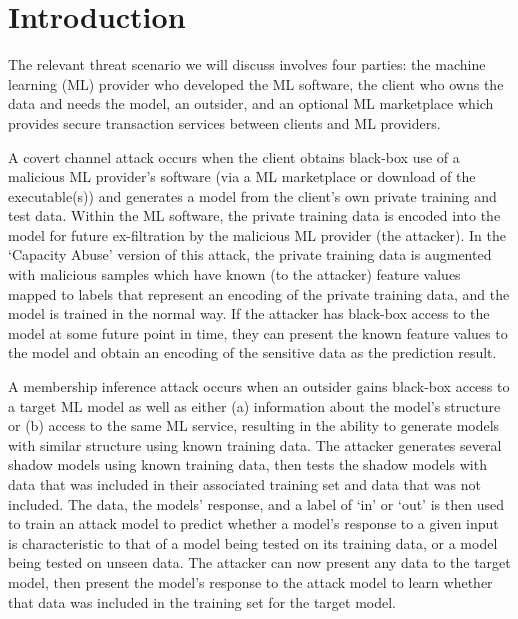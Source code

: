 \section{Introduction}
The relevant threat scenario we will discuss involves four parties: the machine learning (ML) provider who developed the ML software, the client who owns the data and needs the model, an outsider, and an optional ML marketplace which provides secure transaction services between clients and ML providers.

A covert channel attack occurs when the client obtains black-box use of a malicious ML provider's software (via a ML marketplace or download of the executable(s)) and generates a model from the client's own private training and test data.  Within the ML software, the private training data is encoded into the model for future ex-filtration by the malicious ML provider (the attacker).  In the `Capacity Abuse' version of this attack, the private training data is augmented with malicious samples which have known (to the attacker) feature values mapped to labels that represent an encoding of the private training data, and the model is trained in the normal way.  If the attacker has black-box access to the model at some future point in time, they can present the known feature values to the model and obtain an encoding of the sensitive data as the prediction result. \cite{DBLP:journals/corr/abs-1709-07886}

A membership inference attack occurs when an outsider gains black-box access to a target ML model as well as either (a) information about the model's structure or (b) access to the same ML service, resulting in the ability to generate models with similar structure using known training data.  The attacker generates several shadow models using known training data, then tests the shadow models with data that was included in their associated training set and data that was not included.  The data, the models' response, and a label of `in' or `out' is then used to train an attack model to predict whether a model's response to a given input is characteristic to that of a model being tested on its training data, or a model being tested on unseen data.  The attacker can now present any data to the target model, then present the model's response to the attack model to learn whether that data was included in the training set for the target model. \cite{DBLP:journals/corr/ShokriSS16}

